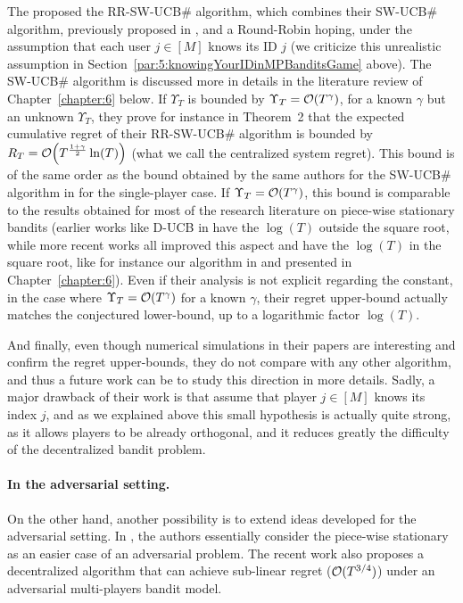 The proposed the RR-SW-UCB\# algorithm, which combines their SW-UCB\# algorithm, previously proposed in \cite{WeiSrivastava18Abruptly}, and a Round-Robin hoping, under the assumption that each user $j\in[M]$ knows its ID $j$ (we criticize this unrealistic assumption in Section~\ref{par:5:knowingYourIDinMPBanditsGame} above).
The SW-UCB\# algorithm is discussed more in details in the literature review of Chapter~\ref{chapter:6} below.
%
If $\Upsilon_T$ is bounded by $\Upsilon_T = \mathop{}\mathopen{}\mathcal{O}\mathopen{}\left(T^{\gamma}\right)$, for a known $\gamma$ but an unknown $\Upsilon_T$, they prove for instance in Theorem~2 \cite{WeiSrivastava18Distributed} that the expected cumulative regret of their RR-SW-UCB\# algorithm is bounded by $R_T = \mathop{}\mathopen{}\mathcal{O}\mathopen{}\left(T^{\frac{1+\gamma}{2}} \ln(T)\right)$ (what we call the centralized system regret).
This bound is of the same order as the bound obtained by the same authors for the SW-UCB\# algorithm in \cite{WeiSrivastava18Abruptly} for the single-player case.
If $\Upsilon_T = \mathop{}\mathopen{}\mathcal{O}\mathopen{}\left(T^{\gamma}\right)$, this bound is comparable to the results obtained for most of the research literature on piece-wise stationary bandits (earlier works like D-UCB in \cite{Garivier11UCBDiscount} have the $\log(T)$ outside the square root, while more recent works all improved this aspect and have the $\log(T)$ in the square root, like for instance our algorithm \GLRklUCB{} in \cite{Besson2019GLRT} and presented in Chapter~\ref{chapter:6}).
Even if their analysis is not explicit regarding the constant, in the case where $\Upsilon_T = \mathop{}\mathopen{}\mathcal{O}\mathopen{}\left(T^{\gamma}\right)$ for a known $\gamma$, their regret upper-bound actually matches the conjectured lower-bound, up to a logarithmic factor $\log(T)$.

And finally, even though numerical simulations in their papers \cite{WeiSrivastava18Abruptly,WeiSrivastava18Distributed} are interesting and confirm the regret upper-bounds, they do not compare with any other algorithm, and thus a future work can be to study this direction in more details.
Sadly, a major drawback of their work is that assume that player $j\in[M]$ knows its index $j$, and as we explained above this small hypothesis is actually quite strong, as it allows players to be already orthogonal, and it reduces greatly the difficulty of the decentralized bandit problem.


\paragraph{In the adversarial setting.}
%
On the other hand, another possibility is to extend ideas developed for the adversarial setting.
In \cite{AlaturLevyKrause19}, the authors essentially consider the piece-wise stationary as an easier case of an adversarial problem.
The recent work \cite{bande2019adversarial} also proposes a decentralized algorithm that can achieve sub-linear regret ($\mathcal{O}(T^{3/4})$) under an adversarial multi-players bandit model.

